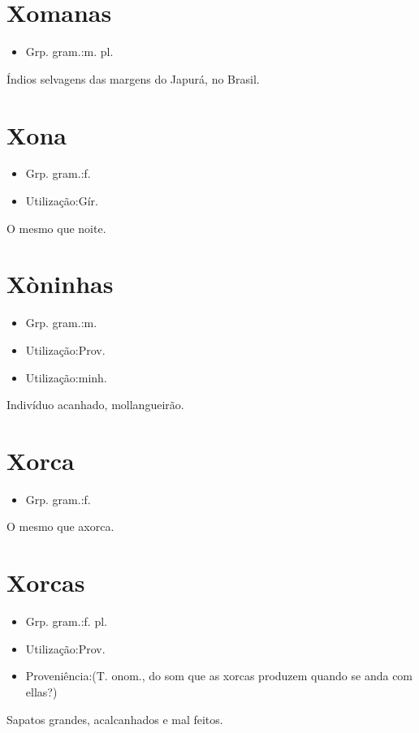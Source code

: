\section{Xomanas}
\begin{itemize}
\item {Grp. gram.:m. pl.}
\end{itemize}
Índios selvagens das margens do Japurá, no Brasil.
\section{Xona}
\begin{itemize}
\item {Grp. gram.:f.}
\end{itemize}
\begin{itemize}
\item {Utilização:Gír.}
\end{itemize}
O mesmo que \textunderscore noite\textunderscore .
\section{Xòninhas}
\begin{itemize}
\item {Grp. gram.:m.}
\end{itemize}
\begin{itemize}
\item {Utilização:Prov.}
\end{itemize}
\begin{itemize}
\item {Utilização:minh.}
\end{itemize}
Indivíduo acanhado, mollangueirão.
\section{Xorca}
\begin{itemize}
\item {Grp. gram.:f.}
\end{itemize}
O mesmo que \textunderscore axorca\textunderscore .
\section{Xorcas}
\begin{itemize}
\item {Grp. gram.:f. pl.}
\end{itemize}
\begin{itemize}
\item {Utilização:Prov.}
\end{itemize}
\begin{itemize}
\item {Proveniência:(T. onom., do som que as xorcas produzem quando se anda com ellas?)}
\end{itemize}
Sapatos grandes, acalcanhados e mal feitos.
